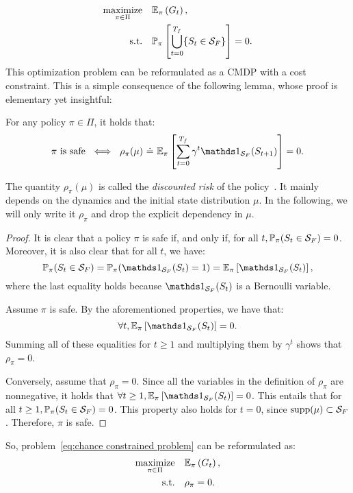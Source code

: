 \begin{equation}
	\begin{aligned}
		\underset{\pi\in\Pi}{\text{maximize}} & \quad\mathbb{E}_\pi\left(G_t\right),\\
		\text{s.t.} & \quad \mathbb{P}_\pi\left[\bigcup_{t=0}^{{T_f}}\{S_t\in{\ensuremath{\mathcal{S}}_{F}}\}\right] = 0.
	\end{aligned} \label{eq:chance constrained problem}
\end{equation}
This optimization problem can be reformulated as a CMDP with a cost constraint. This is a simple consequence of the following lemma, whose proof is elementary yet insightful:
\begin{lemma}
	For any policy $\pi\in\Pi$, it holds that:
	\begin{equation}
		\pi~\text{is safe}~\iff~\rho_\pi(\mu)~\eqdef~\expected_\pi\left[\sum_{t=0}^\Tf\gamma^t\indicator_\SF(S_{t+1})\right] = 0.
	\end{equation}
\end{lemma}
The quantity $\rho_\pi(\mu)$ is called the\emph{ discounted risk} of the policy~\cite{geibel2005risk}. It mainly depends on the dynamics and the initial state distribution $\mu$. In the following, we will only write it $\rho_\pi$ and drop the explicit dependency in $\mu$.
\begin{proof}
	It is clear that a policy $\pi$ is safe if, and only if, for all $t, \mathbb{P}_\pi(S_t \in{\ensuremath{\mathcal{S}}_{F}}) = 0$. Moreover, it is also clear that for all $t$, we have: $$ \P_\pi(S_t\in\SF) = \P_\pi(\indicator_\SF(S_t) = 1) =  \expected_\pi\left[\indicator_\SF(S_t)\right],$$ where the last equality holds because $\indicator_\SF(S_t)$ is a Bernoulli variable.\par
	Assume $\pi$ is safe. By the aforementioned properties, we have that:$$\forall t, \expected_\pi\left[\indicator_\SF(S_t)\right] = 0.$$ Summing all of these equalities for $t\geq1$ and multiplying them by $\gamma^t$ shows that $\rho_\pi = 0$.\par
	Conversely, assume that $\rho_\pi = 0$. Since all the variables in the definition of $\rho_\pi$ are nonnegative, it holds that $\forall t \geq 1, \expected_\pi\left[\indicator_\SF(S_t)\right] = 0$. This entails that for all $t\geq 1,  \mathbb{P}_\pi(S_t \in{\ensuremath{\mathcal{S}}_{F}}) = 0$. This property also holds for $t=0$, since $\operatorname{supp}(\mu)\subset{\ensuremath{\mathcal{S}}_{F}}$. Therefore, $\pi$ is safe.
\end{proof}
So, problem~\eqref{eq:chance constrained problem} can be reformulated as:
\begin{align}
		\underset{\pi\in\Pi}{\text{maximize}} & \quad\mathbb{E}_\pi\left(G_t\right), \label{eq:cost constrained problem objective}\\
		\text{s.t.} & \quad \rho_\pi = 0. \label{eq:cost constrained problem constraint}
\end{align}
